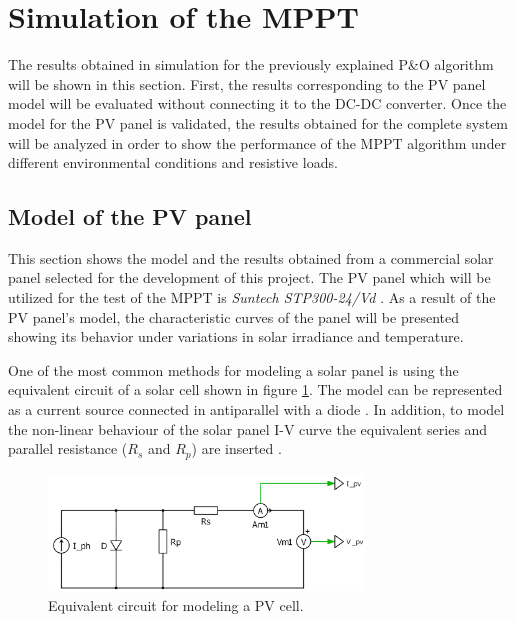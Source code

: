 
\section{Simulation of the MPPT} \label{MPPTSimulation}

The results obtained in simulation for the previously explained P\&O algorithm will be shown in this section. First, the results corresponding to the PV panel model will be evaluated without connecting it to the DC-DC converter. Once the model for the PV panel is validated, the results obtained for the complete system will be analyzed in order to show the performance of the MPPT algorithm under different environmental conditions and resistive loads.  

\subsection{Model of the PV panel}

This section shows the model and the results obtained from a commercial solar panel selected for the development of this project. The PV panel which will be utilized for the test of the MPPT is \textit{Suntech STP300-24/Vd} \cite{PV_panel}. As a result of the PV panel's model, the characteristic curves of the panel will be presented showing its behavior under variations in solar irradiance and temperature.

One of the most common methods for modeling a solar panel is using the equivalent circuit of a solar cell shown in figure \ref{fig:eq_circuit_PVcell}. The model can be represented as a current source connected in antiparallel with a diode \cite{MPPTResearch}. In addition, to model the non-linear behaviour of the solar panel I-V curve the equivalent series and parallel resistance ($R_{s}$ and $R_{p}$) are inserted \cite{MPPTResearch}.

\begin{figure}[H]
	\begin{center}
		\includegraphics[width=0.75\textwidth]{../Pictures/schematic_solar_cell}
		\caption{Equivalent circuit for modeling a PV cell.}
		\label{fig:eq_circuit_PVcell} 
	\end{center}	
\end{figure}

